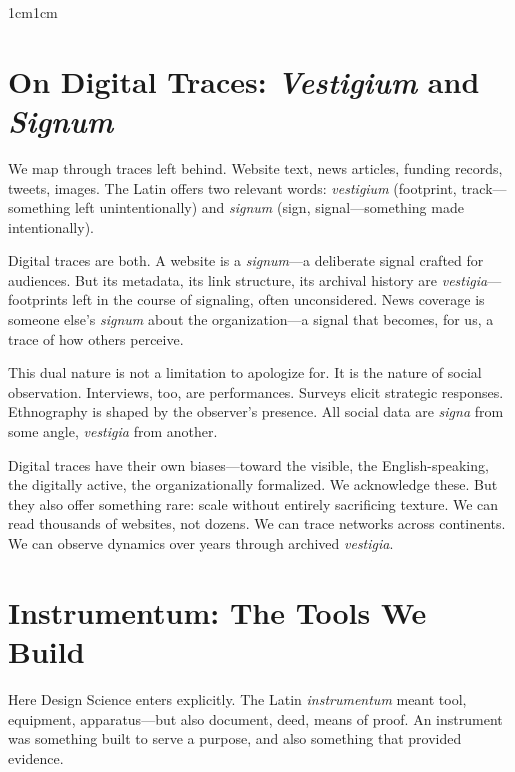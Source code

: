 \documentclass[../main.tex]{subfiles}
\begin{document}
\begin{adjustwidth}{1cm}{1cm}
\vspace{0.8cm}

\section*{On Digital Traces: \textit{Vestigium} and \textit{Signum}}

We map through traces left behind. Website text, news articles, funding records, tweets, images. The Latin offers two relevant words: \textit{vestigium} (footprint, track---something left unintentionally) and \textit{signum} (sign, signal---something made intentionally).

Digital traces are both. A website is a \textit{signum}---a deliberate signal crafted for audiences. But its metadata, its link structure, its archival history are \textit{vestigia}---footprints left in the course of signaling, often unconsidered. News coverage is someone else's \textit{signum} about the organization---a signal that becomes, for us, a trace of how others perceive.

This dual nature is not a limitation to apologize for. It is the nature of social observation. Interviews, too, are performances. Surveys elicit strategic responses. Ethnography is shaped by the observer's presence. All social data are \textit{signa} from some angle, \textit{vestigia} from another.

Digital traces have their own biases---toward the visible, the English-speaking, the digitally active, the organizationally formalized. We acknowledge these. But they also offer something rare: scale without entirely sacrificing texture. We can read thousands of websites, not dozens. We can trace networks across continents. We can observe dynamics over years through archived \textit{vestigia}.

\vspace{0.8cm}

\section*{Instrumentum: The Tools We Build}

Here Design Science enters explicitly. The Latin \textit{instrumentum} meant tool, equipment, apparatus---but also document, deed, means of proof. An instrument was something built to serve a purpose, and also something that provided evidence.


\end{adjustwidth}
\end{document}
